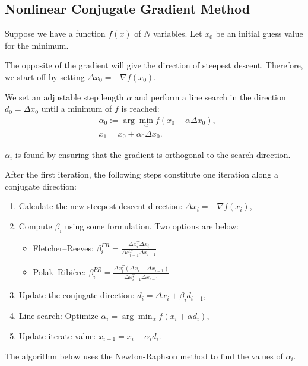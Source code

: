 \documentclass[11pt]{article}
\begin{document}
\subsection*{Nonlinear Conjugate Gradient Method}
Suppose we have a function $f(x)$ of $N$ variables. Let $x_0$ be an initial guess value for the minimum.

The opposite of the gradient will give the direction of steepest descent. Therefore, we start off by setting $\Delta x_0=-\nabla f(x_0)$.

We set an adjustable step length $\alpha$ and perform a line search in the direction $d_0=\Delta x_0$ until a minimum of $f$ is reached:
\begin{align*}
	&\alpha_0:=\arg\min_{\alpha} f(x_0+\alpha\Delta x_0),\\
	&x_1=x_0+\alpha_0\Delta x_0.
\end{align*}

$\alpha_i$ is found by ensuring that the gradient is orthogonal to the search direction.

After the first iteration, the following steps constitute one iteration along a conjugate direction:
\begin{enumerate}
	\item Calculate the new steepest descent direction: $\Delta x_i=-\nabla f(x_i)$,
	\item Compute $\beta_i$ using some formulation. Two options are below:
	\begin{itemize}
		\item Fletcher--Reeves: $\beta_i^{FR}=\frac{\Delta x_i^T\Delta x_i}{\Delta x_{i=1}^T\Delta x_{i-1}}$
		\item Polak--Ribi\`{e}re: $\beta_{i}^{PR}=\frac{\Delta x_i^T(\Delta x_i-\Delta x_{i-1})}{\Delta x_{i-1}^T\Delta x_{i-1}}$
	\end{itemize}
	\item Update the conjugate direction: $d_i=\Delta x_i+\beta_i d_{i-1}$,
	\item Line search: Optimize $\alpha_i =\arg\min_{\alpha} f(x_i+\alpha d_i)$,
	\item Update iterate value: $x_{i+1}=x_i+\alpha_i d_i$.
\end{enumerate}

The algorithm below uses the Newton-Raphson method to find the values of $\alpha_i$.
\end{document}

